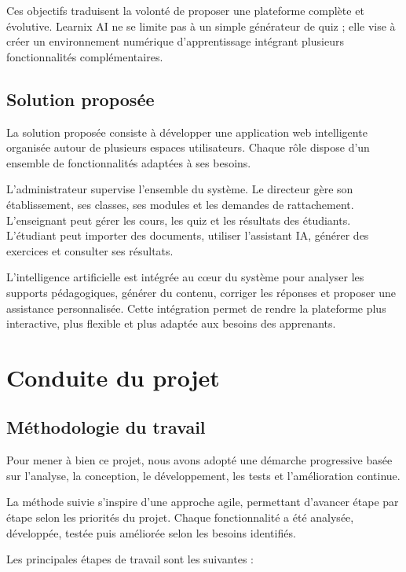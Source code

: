 \documentclass[12pt,a4paper]{report}
\begin{document}
Ces objectifs traduisent la volonté de proposer une plateforme complète et
évolutive. Learnix AI ne se limite pas à un simple générateur de quiz ; elle
vise à créer un environnement numérique d'apprentissage intégrant plusieurs
fonctionnalités complémentaires.

\subsection{Solution proposée}

La solution proposée consiste à développer une application web intelligente
organisée autour de plusieurs espaces utilisateurs. Chaque rôle dispose d'un
ensemble de fonctionnalités adaptées à ses besoins.

L'administrateur supervise l'ensemble du système. Le directeur gère son
établissement, ses classes, ses modules et les demandes de rattachement.
L'enseignant peut gérer les cours, les quiz et les résultats des étudiants.
L'étudiant peut importer des documents, utiliser l'assistant IA, générer des
exercices et consulter ses résultats.

L'intelligence artificielle est intégrée au cœur du système pour analyser les
supports pédagogiques, générer du contenu, corriger les réponses et proposer une
assistance personnalisée. Cette intégration permet de rendre la plateforme plus
interactive, plus flexible et plus adaptée aux besoins des apprenants.

\section{Conduite du projet}

\subsection{Méthodologie du travail}

Pour mener à bien ce projet, nous avons adopté une démarche progressive basée sur l'analyse, la conception, le développement, les tests et l'amélioration continue.

La méthode suivie s'inspire d'une approche agile, permettant d'avancer étape par étape selon les priorités du projet. Chaque fonctionnalité a été analysée, développée, testée puis améliorée selon les besoins identifiés.

Les principales étapes de travail sont les suivantes :
\end{document}
